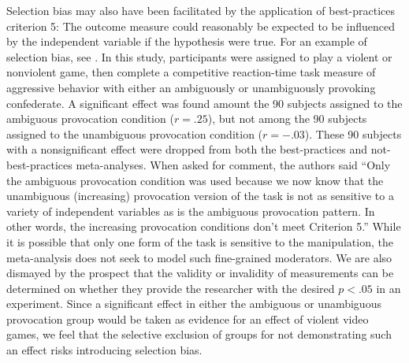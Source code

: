 \documentclass[man]{apa6}
\begin{document}

Selection bias may also have been facilitated by the application of best-practices criterion 5: The outcome measure could reasonably be expected to be influenced by the independent variable if the hypothesis were true. For an example of selection bias, see \citet[study 2]{Anderson:etal:2004}. In this study, participants were assigned to play a violent or nonviolent game, then complete a competitive reaction-time task measure of aggressive behavior with either an ambiguously or unambiguously provoking confederate. A significant effect was found amount the 90  subjects assigned to the ambiguous provocation condition ($r = .25$), but not among the 90 subjects assigned to the unambiguous provocation condition ($r = -.03$). These 90 subjects with a nonsignificant effect were dropped from both the best-practices and not-best-practices meta-analyses. When asked for comment, the authors said ``Only the ambiguous provocation condition was used because we now know that the unambiguous (increasing) provocation version of the task is not as sensitive to a variety of independent variables as is the ambiguous provocation pattern. In other words, the increasing provocation conditions don't meet Criterion 5.'' While it is possible that only one form of the task is sensitive to the manipulation, the meta-analysis does not seek to model such fine-grained moderators. We are also dismayed by the prospect that the validity or invalidity of measurements can be determined on whether they provide the researcher with the desired $p<.05$ in an experiment. Since a significant effect in either the ambiguous or unambiguous provocation group would be taken as evidence for an effect of violent video games, we feel that the selective exclusion of groups for not demonstrating such an effect risks introducing selection bias.
\end{document}

